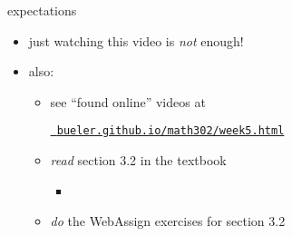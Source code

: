 \documentclass{beamer}
\begin{document}
\begin{frame}{expectations}

\begin{itemize}
\item just watching this video is \emph{not} enough!

\item also:
     \begin{itemize}
     \item see ``found online'' videos at

     \centerline{\href{https://bueler.github.io/math302/week5.html}{\tt \color{cyan} bueler.github.io/math302/week5.html}}
     \item \emph{read} section 3.2 in the textbook
         \begin{itemize}
         \item 
         \end{itemize}
     \item \emph{do} the WebAssign exercises for section 3.2
     \end{itemize}
\end{itemize}
\end{frame}
\end{document}
